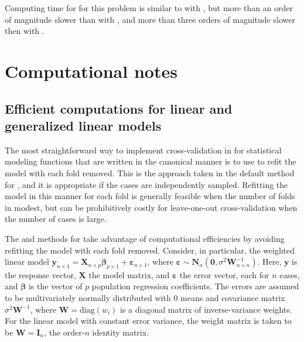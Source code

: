 \documentclass[
]{jss}
\begin{document}
Computing time for  for this problem is similar to
 with , but more than an order of
magnitude slower than  with , and
more than three orders of magnitude slower then  with
.

\section{Computational notes}\label{computational-notes}

\subsection{Efficient computations for linear and generalized linear
models}\label{efficient-computations-for-linear-and-generalized-linear-models}

The most straightforward way to implement cross-validation in
 for statistical modeling functions that are written in the
canonical manner is to use  to refit the model with each
fold removed. This is the approach taken in the default method for
, and it is appropriate if the cases are independently
sampled. Refitting the model in this manner for each fold is generally
feasible when the number of folds in modest, but can be prohibitively
costly for leave-one-out cross-validation when the number of cases is
large.

The  and  methods for  take advantage
of computational efficiencies by avoiding refitting the model with each
fold removed. Consider, in particular, the weighted linear model
\(\mathbf{y}_{n \times 1} = \mathbf{X}_{n \times p}\boldsymbol{\beta}_{p \times 1} + \boldsymbol{\varepsilon}_{n \times 1}\),
where
\(\boldsymbol{\varepsilon} \sim \mathbf{N}_n \left(\mathbf{0}, \sigma^2 \mathbf{W}^{-1}_{n \times n}\right)\).
Here, \(\mathbf{y}\) is the response vector, \(\mathbf{X}\) the model
matrix, and \(\boldsymbol{\varepsilon}\) the error vector, each for
\(n\) cases, and \(\boldsymbol{\beta}\) is the vector of \(p\)
population regression coefficients. The errors are assumed to be
multivariately normally distributed with 0 means and covariance matrix
\(\sigma^2 \mathbf{W}^{-1}\), where \(\mathbf{W} = \mathrm{diag}(w_i)\)
is a diagonal matrix of inverse-variance weights. For the linear model
with constant error variance, the weight matrix is taken to be
\(\mathbf{W} = \mathbf{I}_n\), the order-\(n\) identity matrix.
\end{document}
